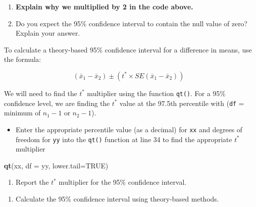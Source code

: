 \documentclass[
]{report}
\newenvironment{Shaded}{\begin{snugshade}}{\end{snugshade}}
\newcommand{\AttributeTok}[1]{\textcolor[rgb]{0.13,0.29,0.53}{#1}}
\newcommand{\ConstantTok}[1]{\textcolor[rgb]{0.56,0.35,0.01}{#1}}
\newcommand{\FunctionTok}[1]{\textcolor[rgb]{0.13,0.29,0.53}{\textbf{#1}}}
\newcommand{\NormalTok}[1]{#1}
\providecommand{\tightlist}{%
  \setlength{\itemsep}{0pt}\setlength{\parskip}{0pt}}
\begin{document}
\vspace{0.3in}

\begin{enumerate}
\def\labelenumi{\arabic{enumi}.}
\setcounter{enumi}{10}
\item
  \textbf{Explain why we multiplied by 2 in the code above.}
  \vspace{0.3in}
\item
  Do you expect the 95\% confidence interval to contain the null value of zero? Explain your answer.
  \vspace{0.8in}
\end{enumerate}

\newpage

To calculate a theory-based 95\% confidence interval for a difference in means, use the formula:

\[(\bar{x}_1- \bar{x}_2)\pm (t^* \times SE(\bar{x}_1- \bar{x}_2))\]

We will need to find the \(t^*\) multiplier using the function \texttt{qt()}. For a 95\% confidence level, we are finding the \(t^*\) value at the 97.5th percentile with (\texttt{df} = minimum of \(n_1 - 1\) or \(n_2 - 1\)).

\begin{itemize}
\tightlist
\item
  Enter the appropriate percentile value (as a decimal) for \texttt{xx} and degrees of freedom for \texttt{yy} into the \texttt{qt()} function at line 34 to find the appropriate \(t^*\) multiplier
\end{itemize}

\begin{Shaded}
\begin{Highlighting}[]
\FunctionTok{qt}\NormalTok{(xx, }\AttributeTok{df =}\NormalTok{ yy, }\AttributeTok{lower.tail=}\ConstantTok{TRUE}\NormalTok{)}
\end{Highlighting}
\end{Shaded}

\begin{enumerate}
\def\labelenumi{\arabic{enumi}.}
\setcounter{enumi}{12}
\tightlist
\item
  Report the \(t^*\) multiplier for the 95\% confidence interval.
\end{enumerate}

\vspace{0.3in}

\begin{enumerate}
\def\labelenumi{\arabic{enumi}.}
\setcounter{enumi}{13}
\tightlist
\item
  Calculate the 95\% confidence interval using theory-based methods.
\end{enumerate}
\end{document}
